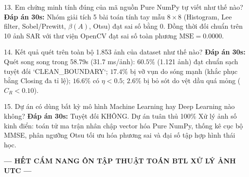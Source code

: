\documentclass[11pt,a4paper]{article}
\begin{document}
\begin{qabox}{13. Em chứng minh tính đúng của mã nguồn Pure NumPy tự viết như thế nào?}
\textbf{Đáp án 30s:} Nhóm giải tích 5 bài toán tính tay mẫu $8 \times 8$ (Histogram, Lee filter, Sobel/Prewitt, $\beta(A)$, Otsu) đạt sai số bằng 0. Đồng thời đối chuẩn trên 10 ảnh SAR với thư viện OpenCV đạt sai số toàn phương $\text{MSE} = 0.0000$.
\end{qabox}

\begin{qabox}{14. Kết quả quét trên toàn bộ 1.853 ảnh của dataset như thế nào?}
\textbf{Đáp án 30s:} Quét song song trong 58.79s (31.7 ms/ảnh): $60.5\%$ (1.121 ảnh) đạt chuẩn sạch tuyệt đối `CLEAN_BOUNDARY`; $17.4\%$ bị vỡ vụn do sóng mạnh (khắc phục bằng Closing đa tỉ lệ); $16.6\%$ có $\eta < 0.5$; $2.6\%$ bị bỏ sót do vệt dầu quá mỏng ($C_R < 0.10$).
\end{qabox}

\begin{qabox}{15. Dự án có dùng bất kỳ mô hình Machine Learning hay Deep Learning nào không?}
\textbf{Đáp án 30s:} Tuyệt đối KHÔNG. Dự án tuân thủ 100\% Xử lý ảnh số kinh điển: toán tử ma trận nhân chập vector hóa Pure NumPy, thống kê cục bộ MMSE, phân ngưỡng Otsu tối ưu hóa phương sai và đại số tập hợp hình thái học.
\end{qabox}

\vfill
\begin{center}
\textbf{--- HẾT CẨM NANG ÔN TẬP THUẬT TOÁN BTL XỬ LÝ ẢNH UTC ---}
\end{center}
\end{document}
